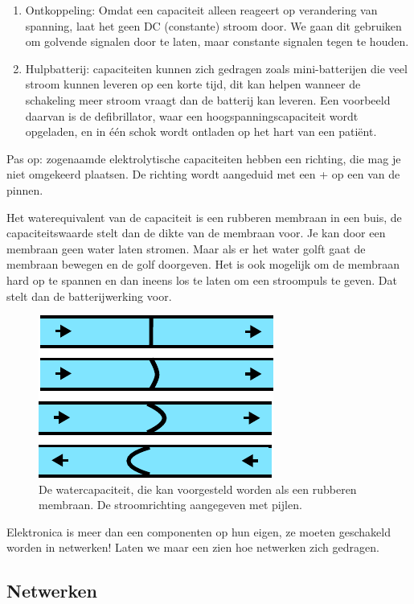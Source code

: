 \documentclass{article}
\begin{document}
		\begin{enumerate}
			\item Ontkoppeling: Omdat een capaciteit alleen reageert op verandering van spanning, laat het geen DC (constante) stroom door. We gaan dit gebruiken om golvende signalen door te laten, maar constante signalen tegen te houden.
			\item Hulpbatterij: capaciteiten kunnen zich gedragen zoals mini-batterijen die veel stroom kunnen leveren op een korte tijd, dit kan helpen wanneer de schakeling meer stroom vraagt dan de batterij kan leveren. Een voorbeeld daarvan is de defibrillator, waar een hoogspanningscapaciteit wordt opgeladen, en in \'e\'en schok wordt ontladen op het hart van een pati\"ent.
		\end{enumerate}
		Pas op: zogenaamde elektrolytische capaciteiten hebben een richting, die mag je niet omgekeerd plaatsen. De richting wordt aangeduid met een + op een van de pinnen.

		Het waterequivalent van de capaciteit is een rubberen membraan in een buis, de capaciteitswaarde stelt dan de dikte van de membraan voor. Je kan door een membraan geen water laten stromen. Maar als er het water golft gaat de membraan bewegen en de golf doorgeven. Het is ook mogelijk om de membraan hard op te spannen en dan ineens los te laten om een stroompuls te geven. Dat stelt dan de batterijwerking voor.
		\begin{figure}[htbp]
				\centering
				\includegraphics{watercap}
				\caption{De watercapaciteit, die kan voorgesteld worden als een rubberen membraan. De stroomrichting aangegeven met pijlen.}
				\label{fig:watercap}
			\end{figure}

		Elektronica is meer dan een componenten op hun eigen, ze moeten geschakeld worden in netwerken! Laten we maar een zien hoe netwerken zich gedragen.

		\subsection{Netwerken}
\end{document}
